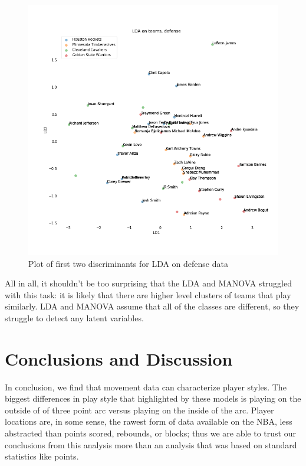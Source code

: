 \documentclass[]{article}
\begin{document}
\begin{figure}
\centering
\includegraphics{LDA_players_teams_defense.png}
\caption{Plot of first two discriminants for LDA on defense data}
\end{figure}

All in all, it shouldn't be too surprising that the LDA and MANOVA
struggled with this task: it is likely that there are higher level
clusters of teams that play similarly. LDA and MANOVA assume that all of
the classes are different, so they struggle to detect any latent
variables.

\hypertarget{conclusions-and-discussion}{%
\section{Conclusions and Discussion}\label{conclusions-and-discussion}}

In conclusion, we find that movement data can characterize player
styles. The biggest differences in play style that highlighted by these
models is playing on the outside of of three point arc versus playing on
the inside of the arc. Player locations are, in some sense, the rawest
form of data available on the NBA, less abstracted than points scored,
rebounds, or blocks; thus we are able to trust our conclusions from this
analysis more than an analysis that was based on standard statistics
like points.
\end{document}
